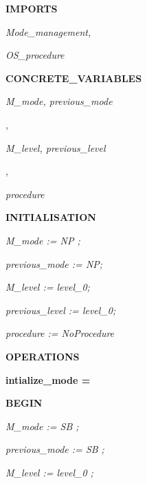 \documentclass[11pt]{article}
\begin{document}
\begin{sloppypar}
\hspace*{0.15in}

\bf IMPORTS

\hspace*{0.20in}\it Mode\_management\rm ,

\hspace*{0.20in}\it OS\_procedure

\hspace*{0.20in}

\bf CONCRETE\_VARIABLES

\hspace*{0.15in}\it M\_mode\rm , \it previous\_mode

\hspace*{0.20in}\rm ,

\hspace*{0.20in}\it M\_level\rm , \it previous\_level

\hspace*{0.20in}\rm ,

\hspace*{0.20in}\it procedure

\vspace*{4mm}
\bf INITIALISATION

\hspace*{0.20in}\it M\_mode \rm := \it NP \rm ;

\hspace*{0.20in}\it previous\_mode \rm := \it NP\rm ;

\hspace*{0.20in}\it M\_level \rm := \it level\_0\rm ;

\hspace*{0.20in}\it previous\_level \rm := \it level\_0\rm ;

\hspace*{0.20in}\it procedure \rm := \it NoProcedure\hspace*{0.10in}

\vspace*{4mm}
\bf OPERATIONS

\hspace*{0.15in}\bf intialize\_mode \rm =

\hspace*{0.15in}\bf BEGIN

\hspace*{0.35in}\it M\_mode \rm := \it SB \rm ;

\hspace*{0.35in}\it previous\_mode \rm := \it SB \rm ;

\hspace*{0.35in}\it M\_level \rm := \it level\_0 \rm ;


\end{sloppypar}
\end{document}
